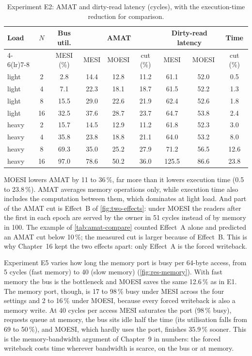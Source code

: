 \begin{table}[htbp]
\centering
\caption{Experiment E2: AMAT and dirty-read latency (cycles), with the
execution-time reduction for comparison.}
\label{tab:res-amat}
\small
\begin{tabular}{@{}l c c c c c c c c@{}}
\toprule
Load & $N$ & Bus util. & \multicolumn{3}{c}{AMAT} &
  \multicolumn{2}{c}{Dirty-read latency} & Time \\
\cmidrule(lr){4-6}\cmidrule(lr){7-8}
 & & MESI (\%) & MESI & MOESI & cut (\%) & MESI & MOESI & cut (\%) \\
\midrule
light & 2 & 2.8 & 14.4 & 12.8 & 11.2 & 61.1 & 52.0 & 0.5 \\
light & 4 & 7.1 & 22.3 & 18.1 & 18.7 & 61.5 & 52.2 & 1.3 \\
light & 8 & 15.5 & 29.0 & 22.6 & 21.9 & 62.4 & 52.6 & 1.8 \\
light & 16 & 32.5 & 37.6 & 28.7 & 23.7 & 64.7 & 53.8 & 2.4 \\
\midrule
heavy & 2 & 15.7 & 14.5 & 12.9 & 11.2 & 61.8 & 52.3 & 3.0 \\
heavy & 4 & 35.8 & 23.8 & 18.8 & 21.1 & 64.0 & 53.2 & 8.0 \\
heavy & 8 & 69.3 & 35.0 & 25.2 & 27.9 & 71.2 & 56.5 & 12.6 \\
heavy & 16 & 97.0 & 78.6 & 50.2 & 36.0 & 125.5 & 86.6 & 23.8 \\
\bottomrule
\end{tabular}
\end{table}

MOESI lowers AMAT by 11 to 36\,\%, far more than it lowers execution time (0.5 to
23.8\,\%). AMAT averages memory operations only, while execution time also includes
the computation between them, which dominates at light load. And part of the AMAT
cut is Effect~B of \cref{fig:two-effects}: under MOESI the readers after the first
in each epoch are served by the owner in 51 cycles instead of by memory in 100. The
example of \cref{tab:amat-compare} counted Effect~A alone and predicted an AMAT cut
below 10\,\%; the measured cut is larger because of Effect~B. This is why
Chapter~16 kept the two effects apart: only Effect~A is the forced writeback.

Experiment E5 varies how long the memory port is busy per 64-byte access, from 5
cycles (fast memory) to 40 (slow memory) (\cref{fig:res-memory}). With fast memory
the bus is the bottleneck and MOESI saves the same 12.6\,\% as in E1. The memory
port, though, is 17 to 98\,\% busy under MESI across the four settings and 2 to
16\,\% under MOESI, because every forced writeback is also a memory write. At 40
cycles per access MESI saturates the port (98\,\% busy), requests queue at memory,
the bus sits idle half the time (its utilisation falls from 69 to 50\,\%), and
MOESI, which hardly uses the port, finishes 35.9\,\% sooner. This is the
memory-bandwidth argument of Chapter~9 in numbers: the forced writeback costs time
wherever bandwidth is scarce, on the bus or at memory.

